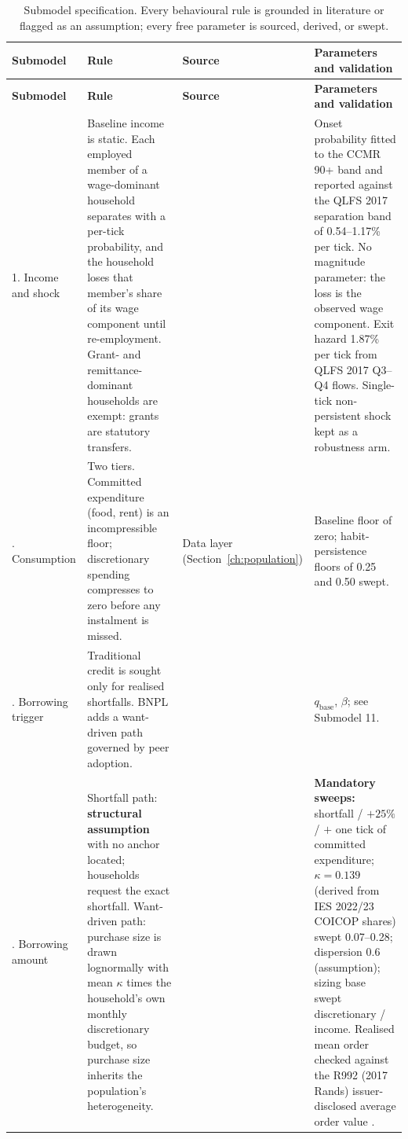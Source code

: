 \begingroup
\setlength{\tabcolsep}{4pt}
\small
\begin{longtable}{L{2.35cm}L{4.75cm}L{2.3cm}L{4.0cm}}
\caption{Submodel specification. Every behavioural rule is grounded in literature or flagged as
an assumption; every free parameter is sourced, derived, or swept.}
\label{tab:submodels} \\
\toprule
\textbf{Submodel} & \textbf{Rule} & \textbf{Source} & \textbf{Parameters and validation} \\
\midrule
\endfirsthead
\toprule
\textbf{Submodel} & \textbf{Rule} & \textbf{Source} & \textbf{Parameters and validation} \\
\midrule
\endhead
\bottomrule
\endfoot

1. Income and shock & Baseline income is static. Each employed member of a wage-dominant household separates with a per-tick probability, and the household loses that member's share of its wage component until re-employment. Grant- and remittance-dominant households are exempt: grants are statutory transfers. & \cite{madeira2018chile, statssa_lmd_2022} & Onset probability fitted to the \ac{CCMR} 90+ band and reported against the \ac{QLFS} 2017 separation band of 0.54--1.17\% per tick. No magnitude parameter: the loss is the observed wage component. Exit hazard 1.87\% per tick from \ac{QLFS} 2017 Q3--Q4 flows. Single-tick non-persistent shock kept as a robustness arm. \\
. Consumption & Two tiers. Committed expenditure (food, rent) is an incompressible floor; discretionary spending compresses to zero before any instalment is missed. & Data layer (Section~\ref{ch:population}) & Baseline floor of zero; habit-persistence floors of 0.25 and 0.50 swept. \\
. Borrowing trigger & Traditional credit is sought only for realised shortfalls. \ac{BNPL} adds a want-driven path governed by peer adoption. & \cite{dorazio2017micro, ackert2025bnpl, dehaan2024bnpl} & $q_{\text{base}}$, $\beta$; see Submodel 11. \\
. Borrowing amount & Shortfall path: \textbf{structural assumption} with no anchor located; households request the exact shortfall. Want-driven path: purchase size is drawn lognormally with mean $\kappa$ times the household's own monthly discretionary budget, so purchase size inherits the population's heterogeneity. & \cite{statssa_ies_2023} & \textbf{Mandatory sweeps:} shortfall / $+25\%$ / $+$ one tick of committed expenditure; $\kappa = 0.139$ (derived from IES 2022/23 COICOP shares) swept 0.07--0.28; dispersion 0.6 (assumption); sizing base swept discretionary / income. Realised mean order checked against the R992 (2017 Rands) issuer-disclosed average order value \cite{weaver2025iar}. \\

\end{longtable}
